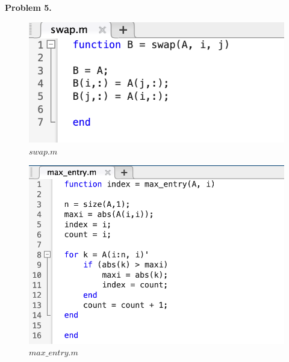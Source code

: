 \documentclass{article}
\begin{document}
\textbf{Problem 5.}
\begin{figure}[htb]
    \qquad
    \begin{minipage}{.4\textwidth}
        \centering
        {\includegraphics[scale=0.6]{swap.png}}
        \qquad\qquad$swap.m$\label{fig:1}
    \end{minipage}    
    \qquad\qquad\quad
    \begin{minipage}{.4\textwidth}
        \centering
        {\includegraphics[scale=0.45]{max_entry.png}}
        \qquad\qquad$max\_entry.m$\label{fig:2}
    \end{minipage}        
\end{figure} 
\end{document}
